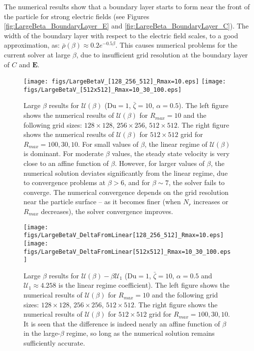\documentclass[preprint,10pt]{elsarticle}
\newcommand\bE{\boldsymbol{E}}
\newcommand\Du{\text{Du}}
\newcommand\cU{\mathscr{U}}
\begin{document}
The numerical results show that a boundary layer starts to form near the front 
of the particle for strong electric fields (see Figures \ref{fig:LargeBeta_BoundaryLayer_E}
and \ref{fig:LargeBeta_BoundaryLayer_C}).
The width of the boundary layer with respect to the electric field scales, to a good approximation, as: $\bar\rho(\beta) \approx 0.2 e^{-0.5 \beta}$.
This causes numerical problems for the current solver at large $\beta$, due to insufficient
grid resolution at the boundary layer of $C$ and $\bE$.

\begin{figure}
    \begin{center}
    \texttt{[image: figs/LargeBetaV\_[128\_256\_512]\_Rmax=10.eps]}
    \texttt{[image: figs/LargeBetaV\_[512x512]\_Rmax=10\_30\_100.eps]}
        \caption[Large $\beta$ results for $\cU$]
{Large $\beta$ results for $\cU(\beta)$ ($\Du = 1$, $\bar\zeta = 10$, $\alpha = 0.5$). 
The left figure shows the numerical results of $\cU(\beta)$ for $R_{max} = 10$ and the following grid sizes: $128 \times 128$, $256 \times 256$, $512 \times 512$. 
The right figure shows the numerical results of $\cU(\beta)$ for
$512 \times 512$ grid for $R_{max} = 100, 30, 10$. For small values of $\beta$, the linear
regime of $\cU(\beta)$ is dominant. 
For moderate $\beta$ values, the steady state velocity is very close to an affine function of $\beta$.
However, for larger values of $\beta$, the numerical solution
deviates significantly from the linear regime, due to convergence problems at $\beta > 6$, 
and for $\beta \sim 7$, the solver fails to converge. The numerical convergence 
depends on the grid resolution near the particle surface -- 
as it becomes finer (when $N_r$ increases or $R_{max}$ decreases), the solver convergence improves.}
	    \label{fig:LargeBetaV_grids}	    
    \end{center}
\end{figure}
\begin{figure}
    \begin{center}
    \texttt{[image: figs/LargeBetaV\_DeltaFromLinear[128\_256\_512]\_Rmax=10.eps]}
    \texttt{[image: figs/LargeBetaV\_DeltaFromLinear[512x512]\_Rmax=10\_30\_100.eps]}
        \caption[Large $\beta$ results for $\cU$ -- difference from linear regime]
{Large $\beta$ results for $\cU(\beta) - \beta\cU_1$ ($\Du = 1$, $\bar\zeta = 10$, $\alpha = 0.5$ and $\cU_1 \approx 4.258$ is the linear regime coefficient). 
The left figure shows the numerical results of $\cU(\beta)$ for $R_{max} = 10$ and the following grid sizes: $128 \times 128$, $256 \times 256$, $512 \times 512$. 
The right figure shows the numerical results of $\cU(\beta)$ for
$512 \times 512$ grid for $R_{max} = 100, 30, 10$.
It is seen that the difference is indeed nearly an affine function of $\beta$ in the large-$\beta$ regime, so long as the numerical solution remains sufficiently accurate.}
	    \label{fig:LargeBetaV_DeltaFromLinear_grids}	    
    \end{center}
\end{figure}
\end{document}
